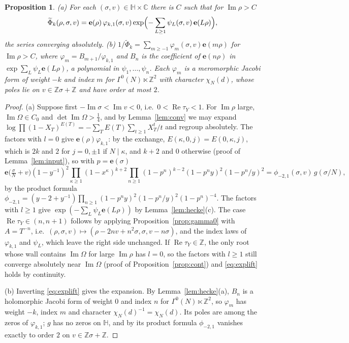 \documentclass[11pt]{amsart}
\numberwithin{equation}{section}
\theoremstyle{plain}
\newtheorem{prop}[thm]{Proposition}
\theoremstyle{definition}
\theoremstyle{remark}
\newcommand{\Z}{\mathbb{Z}}
\newcommand{\C}{\mathbb{C}}
\newcommand{\e}{\mathbf{e}}
\newcommand{\pmi}{\phi_{-2,1}}
\newcommand{\tPhi}{\widetilde{\Phi}}
\begin{document}
\begin{prop}\label{prop:FJ}
\textup{(a)} For each $(\sigma,v)\in\mathbb H\times\C$ there is $C$ such that for $\operatorname{Im}\rho>C$
\begin{equation}\label{eq:explift}
\tPhi_k(\rho,\sigma,v)=\e(\rho)\,\varphi_{k,1}(\sigma,v)\exp\Bigl(-\sum_{L\ge1}\psi_L(\sigma,v)\,\e(L\rho)\Bigr),
\end{equation}
the series converging absolutely.
\textup{(b)} $1/\tPhi_k=\sum_{m\ge-1}\varphi_m(\sigma,v)\e(m\rho)$ for $\operatorname{Im}\rho>C$, where $\varphi_m=B_{m+1}/\varphi_{k,1}$ and $B_n$ is the coefficient of $\e(n\rho)$ in $\exp\sum_L\psi_L\e(L\rho)$, a polynomial in $\psi_1,\dots,\psi_n$. Each $\varphi_m$ is a meromorphic Jacobi form of weight $-k$ and index $m$ for $\Gamma^0(N)\ltimes\Z^2$ with character $\chi_N(d)$, whose poles lie on $v\in\Z\sigma+\Z$ and have order at most $2$.
\end{prop}

\begin{proof}
(a) Suppose first $-\operatorname{Im}\sigma<\operatorname{Im}v<0$, i.e.\ $0<\operatorname{Re}\tau_Y<1$. For $\operatorname{Im}\rho$ large, $\operatorname{Im}\Omega\in C_0$ and $\det\operatorname{Im}\Omega>\frac14$, and by Lemma~\ref{lem:conv} we may expand $\log\prod(1-X_T)^{E(T)}=-\sum_TE(T)\sum_{t\ge1}X_T^t/t$ and regroup absolutely. The factors with $l=0$ give $\e(\rho)\varphi_{k,1}$: by the exchange, $E(\kappa,0,j)=E(0,\kappa,j)$, which is $2k$ and $2$ for $j=0,\pm1$ if $N\mid\kappa$, and $k+2$ and $0$ otherwise (proof of Lemma~\ref{lem:input}), so with $p=\e(\sigma)$
\[
\e\bigl(\tfrac\sigma N+v\bigr)(1-y^{-1})^2\prod_{\kappa\ge1}(1-x^\kappa)^{k+2}\prod_{n\ge1}(1-p^n)^{k-2}(1-p^ny)^2(1-p^n/y)^2=\pmi(\sigma,v)\,g(\sigma/N),
\]
by the product formula $\pmi=(y-2+y^{-1})\prod_{n\ge1}(1-p^ny)^2(1-p^n/y)^2(1-p^n)^{-4}$. The factors with $l\ge1$ give $\exp(-\sum_L\psi_L\e(L\rho))$ by Lemma~\ref{lem:hecke}(c). The case $\operatorname{Re}\tau_Y\in(n,n+1)$ follows by applying Proposition~\ref{prop:gamma0} with $A=T^{-n}$, i.e.\ $(\rho,\sigma,v)\mapsto(\rho-2nv+n^2\sigma,\sigma,v-n\sigma)$, and the index laws of $\varphi_{k,1}$ and $\psi_L$, which leave the right side unchanged. If $\operatorname{Re}\tau_Y\in\Z$, the only root whose wall contains $\operatorname{Im}\Omega$ for large $\operatorname{Im}\rho$ has $l=0$, so the factors with $l\ge1$ still converge absolutely near $\operatorname{Im}\Omega$ (proof of Proposition~\ref{prop:cont}) and \eqref{eq:explift} holds by continuity.

(b) Inverting \eqref{eq:explift} gives the expansion. By Lemma~\ref{lem:hecke}(a), $B_n$ is a holomorphic Jacobi form of weight $0$ and index $n$ for $\Gamma^0(N)\ltimes\Z^2$, so $\varphi_m$ has weight $-k$, index $m$ and character $\chi_N(d)^{-1}=\chi_N(d)$. Its poles are among the zeros of $\varphi_{k,1}$; $g$ has no zeros on $\mathbb H$, and by its product formula $\pmi$ vanishes exactly to order $2$ on $v\in\Z\sigma+\Z$.
\end{proof}
\end{document}
